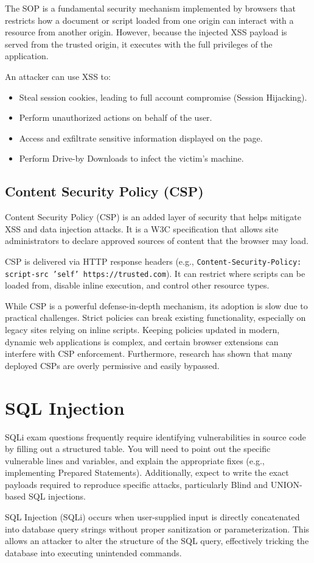 The SOP is a fundamental security mechanism implemented by browsers that restricts how a document or script loaded from one origin can interact with a resource from another origin. However, because the injected XSS payload is served from the trusted origin, it executes with the full privileges of the application. 

An attacker can use XSS to:
\begin{itemize}
    \item Steal session cookies, leading to full account compromise (Session Hijacking).
    \item Perform unauthorized actions on behalf of the user.
    \item Access and exfiltrate sensitive information displayed on the page.
    \item Perform Drive-by Downloads to infect the victim's machine.
\end{itemize}

\subsection{Content Security Policy (CSP)}
Content Security Policy (CSP) is an added layer of security that helps mitigate XSS and data injection attacks. It is a W3C specification that allows site administrators to declare approved sources of content that the browser may load. 

CSP is delivered via HTTP response headers (e.g., \texttt{Content-Security-Policy: script-src 'self' https://trusted.com}). It can restrict where scripts can be loaded from, disable inline execution, and control other resource types.

While CSP is a powerful defense-in-depth mechanism, its adoption is slow due to practical challenges. Strict policies can break existing functionality, especially on legacy sites relying on inline scripts. Keeping policies updated in modern, dynamic web applications is complex, and certain browser extensions can interfere with CSP enforcement. Furthermore, research has shown that many deployed CSPs are overly permissive and easily bypassed.

\section{SQL Injection}
\begin{tcolorbox}[colback=blue!5!white,colframe=blue!75!black,title=Exam Insight]
SQLi exam questions frequently require identifying vulnerabilities in source code by filling out a structured table. You will need to point out the specific vulnerable lines and variables, and explain the appropriate fixes (e.g., implementing Prepared Statements). Additionally, expect to write the exact payloads required to reproduce specific attacks, particularly Blind and UNION-based SQL injections.
\end{tcolorbox}
SQL Injection (SQLi) occurs when user-supplied input is directly concatenated into database query strings without proper sanitization or parameterization. This allows an attacker to alter the structure of the SQL query, effectively tricking the database into executing unintended commands.

